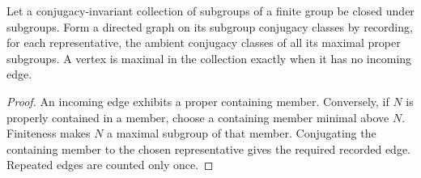 \begin{lemma}\label{maxima}
Let a conjugacy-invariant collection of subgroups of a finite group be closed under subgroups. Form a directed graph on its subgroup conjugacy classes by recording, for each representative, the ambient conjugacy classes of all its maximal proper subgroups. A vertex is maximal in the collection exactly when it has no incoming edge.
\end{lemma}
\begin{proof}
An incoming edge exhibits a proper containing member. Conversely, if $N$ is properly contained in a member, choose a containing member minimal above $N$. Finiteness makes $N$ a maximal subgroup of that member. Conjugating the containing member to the chosen representative gives the required recorded edge. Repeated edges are counted only once.
\end{proof}

